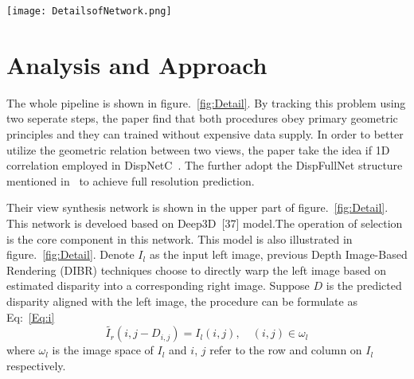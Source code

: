 \documentclass[10pt,twocolumn,letterpaper]{article}
\begin{document}
\begin{figure*}
\begin{center}
   \texttt{[image: DetailsofNetwork.png]}
\end{center}
   \caption{Details of our single view stereo matching network. Upper part is the view synthesis network. The input image is first processed by a CNN. It results in probabilistic disparity maps that help to reconstruct a synthetic right view by selectively taking pixels from nearby locations on the original left image. A stereo matching network, which is shown on the lower part of the figure, then takes both the original left image and synthetic right image to calculate an accurate disparity, which can be transformed into a corresponding depth map given the camera settings~\cite{Luo_2018_CVPR}.}
\label{fig:Detail}
\end{figure*}

\section{Analysis and Approach}
The whole pipeline is shown in figure.~\ref{fig:Detail}. By tracking this problem using two seperate steps, the paper find that both procedures obey primary geometric principles and they can trained without expensive data supply. In order to better utilize the geometric relation between two views, the paper take the idea if 1D correlation employed in DispNetC~\cite{Mayer_2016_CVPR}. The further adopt the DispFullNet structure mentioned in~\cite{Pang2017Cascade} to achieve full resolution prediction.\par
Their view synthesis network is shown in the upper part of figure.~\ref{fig:Detail}. This network is develoed based on Deep3D~[37] model.The operation of selection is the core component in this network. This model is also illustrated in figure.~\ref{fig:Detail}. Denote $I_l$ as the input left image, previous Depth Image-Based Rendering (DIBR) techniques choose to directly warp the left image based on estimated disparity into a corresponding right image. Suppose $D$ is the predicted disparity aligned with the left image, the procedure can be formulate as Eq:~\ref{Eq:i}
\begin{equation}
\tilde{I_r}(i,j-D_{i,j})=I_l(i,j),\quad (i,j)\in\omega_l
\label{Eq:i}
\end{equation}
where $\omega_l$ is the image space of $I_l$ and $i$, $j$ refer to the row and column on $I_l$ respectively.\par
\end{document}

